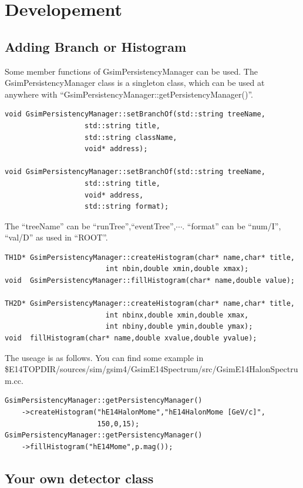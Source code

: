 \documentclass[a4paper,12pt]{article}
\begin{document}
 
 \section{Developement}
 \subsection{Adding Branch or Histogram}
 Some member functions of GsimPersistencyManager can be used. The
 GsimPersistencyManager class is a singleton class, which can be used
 at anywhere with ``GsimPersistencyManager::getPersistencyManager()''.
 \begin{verbatim}
void GsimPersistencyManager::setBranchOf(std::string treeName,
                   std::string title,
                   std::string className,
                   void* address);

void GsimPersistencyManager::setBranchOf(std::string treeName,
                   std::string title,
                   void* address,
                   std::string format);
 \end{verbatim}
 The ``treeName'' can be ``runTree'',``eventTree'',$\cdots$. ``format''
 can be ``num/I'', ``val/D'' as used in ``ROOT''.
 \begin{verbatim}	
TH1D* GsimPersistencyManager::createHistogram(char* name,char* title,
                        int nbin,double xmin,double xmax);
void  GsimPersistencyManager::fillHistogram(char* name,double value);

TH2D* GsimPersistencyManager::createHistogram(char* name,char* title,
                        int nbinx,double xmin,double xmax,
                        int nbiny,double ymin,double ymax);
void  fillHistogram(char* name,double xvalue,double yvalue);
 \end{verbatim}
 The useage is as follows. You can find some example in\\
 \$E14TOPDIR/sources/sim/gsim4/GsimE14Spectrum/src/GsimE14HalonSpectrum.cc.
 \begin{verbatim}
GsimPersistencyManager::getPersistencyManager()
    ->createHistogram("hE14HalonMome","hE14HalonMome [GeV/c]",
                      150,0,15);
GsimPersistencyManager::getPersistencyManager()
    ->fillHistogram("hE14Mome",p.mag());
 \end{verbatim}






 \subsection{Your own detector class}
\end{document}
